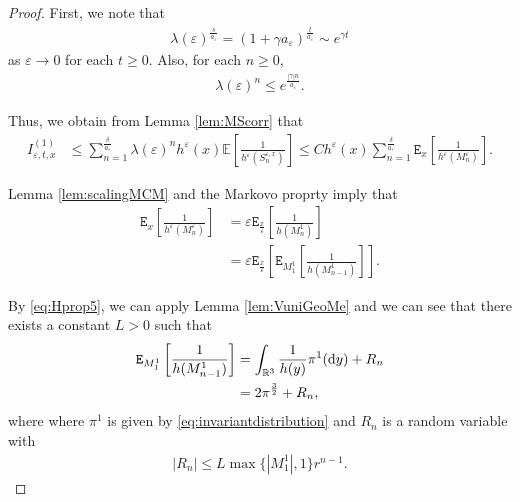 \documentclass[10pt,a4paper]{amsart}
\newcommand{\R}{{\mathbb{R}}}
\newcommand{\dd}{\text{\rm d}}             %
\newcommand{\e}{\varepsilon}
\begin{document}
\begin{proof}
First, we note that \begin{align*}
\lambda(\e)^\frac{s}{a_\e}=\left(1+\gamma{a_\e}\right)^\frac{t}{a_\e}\sim e^{\gamma t}
\end{align*}
as $\e\to 0$ for each $t\geq 0$. Also, for each $n\geq 0$,  
\begin{align*}
\lambda(\e)^n\leq e^{\frac{|\gamma|n}{a_\e}}.
\end{align*}

Thus, we obtain from Lemma \ref{lem:MScorr} that \begin{align*}
I_{\e,t,x}^{(1)}&\leq \sum_{n=1}^{\frac{\delta}{a_\e} }\lambda(\e)^nh^\e(x)\mathbb{E}\left[\frac{1}{h^\e(S_n^{\e,x})}\right]\leq Ch^\e(x)\sum_{n=1}^{\frac{\delta}{a_\e} }\mathtt{E}_x\left[\frac{1}{h^\e(M_n^{\e})}\right].
\end{align*}

Lemma \ref{lem:scalingMCM} and the Markovo proprty imply that 
\begin{align*}
\mathtt{E}_x\left[\frac{1}{h^\e(M_n^{\e})}\right]&=\e\mathtt{E}_{\frac{x}{\e}}\left[\frac{1}{h(M_n^{1})}\right]\\
&=\e \mathtt{E}_{\frac{x}{\e}}\left[\mathtt{E}_{M_1^1}\left[\frac{1}{h(M_{n-1}^{1})}\right]\right].
\end{align*}




By \eqref{eq:Hprop5}, we can apply Lemma \ref{lem:VuniGeoMe} and we can see that  there exists a constant $L>0$ such that \begin{align*}
\mathtt{E}_{M_1^1}\left[\frac{1}{h(M_{n-1}^{1})}\right]&= \int_{\R^3} \frac{1}{h(y)}\pi^1(\dd y)+R_n\\
&=2\pi^\frac{3}{2}+R_n,
\end{align*}
where where $\pi^1$ is given by \eqref{eq:invariantdistribution} and $R_n$ is a random variable with  
\begin{align*}
\left|R_n\right|\leq L\max\{|M_1^1|,1\} r^{n-1}.
\end{align*}
 


\end{proof}
\end{document}

